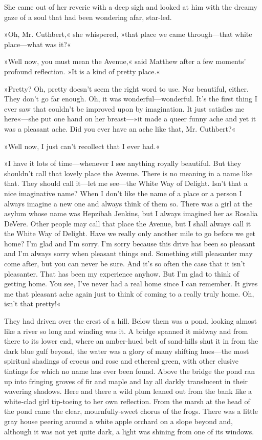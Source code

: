 She came out of her reverie with a deep sigh and looked at him with the dreamy gaze of a soul that had been wondering afar, star-led.

»Oh, Mr. Cuthbert,« she whispered, »that place we came through—that white place—what was it?«

»Well now, you must mean the Avenue,« said Matthew after a few moments' profound reflection. »It is a kind of pretty place.«

»Pretty? Oh, pretty doesn't seem the right word to use. Nor beautiful, either. They don't go far enough. Oh, it was wonderful—wonderful. It's the first thing I ever saw that couldn't be improved upon by imagination. It just satisfies me here«—she put one hand on her breast—»it made a queer funny ache and yet it was a pleasant ache. Did you ever have an ache like that, Mr. Cuthbert?«

»Well now, I just can't recollect that I ever had.«

»I have it lots of time—whenever I see anything royally beautiful. But they shouldn't call that lovely place the Avenue. There is no meaning in a name like that. They should call it—let me see—the White Way of Delight. Isn't that a nice imaginative name? When I don't like the name of a place or a person I always imagine a new one and always think of them so. There was a girl at the asylum whose name was Hepzibah Jenkins, but I always imagined her as Rosalia DeVere. Other people may call that place the Avenue, but I shall always call it the White Way of Delight. Have we really only another mile to go before we get home? I'm glad and I'm sorry. I'm sorry because this drive has been so pleasant and I'm always sorry when pleasant things end. Something still pleasanter may come after, but you can never be sure. And it's so often the case that it isn't pleasanter. That has been my experience anyhow. But I'm glad to think of getting home. You see, I've never had a real home since I can remember. It gives me that pleasant ache again just to think of coming to a really truly home. Oh, isn't that pretty!«

They had driven over the crest of a hill. Below them was a pond, looking almost like a river so long and winding was it. A bridge spanned it midway and from there to its lower end, where an amber-hued belt of sand-hills shut it in from the dark blue gulf beyond, the water was a glory of many shifting hues—the most spiritual shadings of crocus and rose and ethereal green, with other elusive tintings for which no name has ever been found. Above the bridge the pond ran up into fringing groves of fir and maple and lay all darkly translucent in their wavering shadows. Here and there a wild plum leaned out from the bank like a white-clad girl tip-toeing to her own reflection. From the marsh at the head of the pond came the clear, mournfully-sweet chorus of the frogs. There was a little gray house peering around a white apple orchard on a slope beyond and, although it was not yet quite dark, a light was shining from one of its windows.

